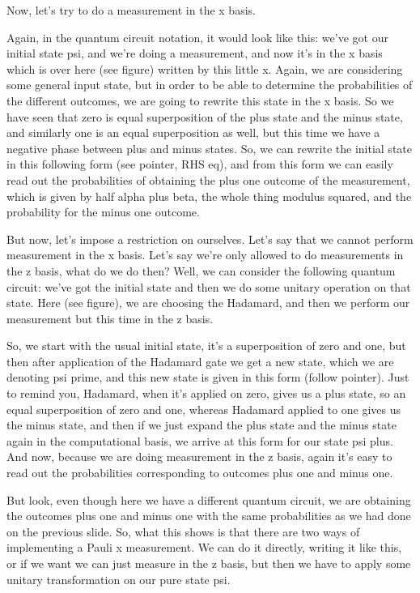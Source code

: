 Now, let's try to do a measurement in the x basis.

Again, in the quantum circuit notation, it would look like this: we've got our initial state psi, and we're doing a measurement, and now it's in the x basis which is over here (see figure) written by this little x. Again, we are considering some general input state, but in order to be able to determine the probabilities of the different outcomes, we are going to rewrite this state in the x basis. So we have seen that zero is equal superposition of the plus state and the minus state, and similarly one is an equal superposition as well, but this time we have a negative phase between plus and minus states. So, we can rewrite the initial state in this following form (see pointer, RHS eq), and from this form we can easily read out the probabilities of obtaining the plus one outcome of the measurement, which is given by half alpha plus beta, the whole thing modulus squared, and the probability for the minus one outcome.

But now, let's impose a restriction on ourselves. Let's say that we cannot perform measurement in the x basis. Let's say we're only allowed to do measurements in the z basis, what do we do then? Well, we can consider the following quantum circuit: we've got the initial state and then we do some unitary operation on that state. Here (see figure), we are choosing the Hadamard, and then we perform our measurement but this time in the z basis.

So, we start with the usual initial state, it's a superposition of zero and one, but then after application of the Hadamard gate we get a new state, which we are denoting psi prime, and this new state is given in this form (follow pointer). Just to remind you, Hadamard, when it's applied on zero, gives us a plus state, so an equal superposition of zero and one, whereas Hadamard applied to one gives us the minus state, and then if we just expand the plus state and the minus state again in the computational basis, we arrive at this form for our state psi plus. And now, because we are doing measurement in the z basis, again it's easy to read out the probabilities corresponding to outcomes plus one and minus one.

But look, even though here we have a different quantum circuit, we are obtaining the outcomes plus one and minus one with the same probabilities as we had done on the previous slide. So, what this shows is that there are two ways of implementing a Pauli x measurement. We can do it directly, writing it like this, or if we want we can just measure in the z basis, but then we have to apply some unitary transformation on our pure state psi.


